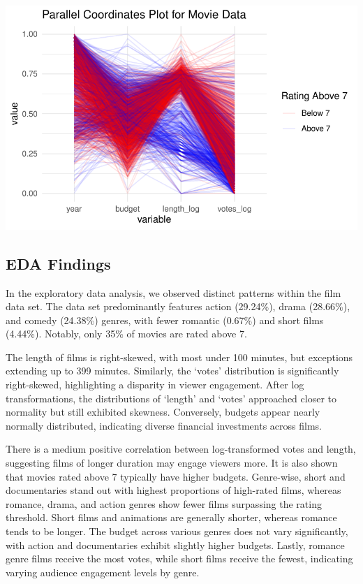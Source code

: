 \documentclass[
  11pt,
]{article}
\begin{document}
\includegraphics{Group_07_Analysis_files/figure-pdf/unnamed-chunk-21-1.pdf}

\hypertarget{eda-findings}{%
\subsection{EDA Findings}\label{eda-findings}}

In the exploratory data analysis, we observed distinct patterns within
the film data set. The data set predominantly features action (29.24\%),
drama (28.66\%), and comedy (24.38\%) genres, with fewer romantic
(0.67\%) and short films (4.44\%). Notably, only 35\% of movies are
rated above 7.

The length of films is right-skewed, with most under 100 minutes, but
exceptions extending up to 399 minutes. Similarly, the `votes'
distribution is significantly right-skewed, highlighting a disparity in
viewer engagement. After log transformations, the distributions of
`length' and `votes' approached closer to normality but still exhibited
skewness. Conversely, budgets appear nearly normally distributed,
indicating diverse financial investments across films.

There is a medium positive correlation between log-transformed votes and
length, suggesting films of longer duration may engage viewers more. It
is also shown that movies rated above 7 typically have higher budgets.
Genre-wise, short and documentaries stand out with highest proportions
of high-rated films, whereas romance, drama, and action genres show
fewer films surpassing the rating threshold. Short films and animations
are generally shorter, whereas romance tends to be longer. The budget
across various genres does not vary significantly, with action and
documentaries exhibit slightly higher budgets. Lastly, romance genre
films receive the most votes, while short films receive the fewest,
indicating varying audience engagement levels by genre.
\end{document}

